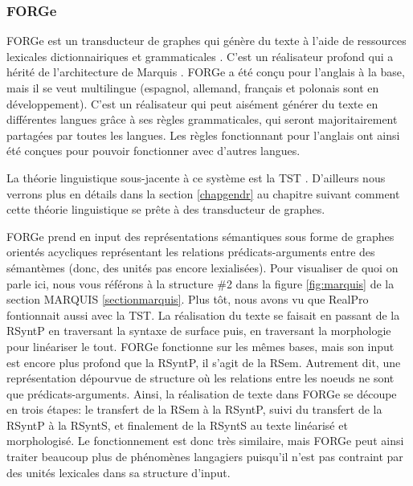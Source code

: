 \subsubsection{FORGe}
FORGe est un transducteur de graphes qui génère du texte à l'aide de ressources lexicales dictionnairiques et grammaticales \citep{MilledemoFORGePompeu2017,DBLP:conf/semeval/MilleCBW17}. C'est un réalisateur profond qui a hérité de l'architecture de Marquis \citep{WannerMARQUISGENERATIONUSERTAILORED2010}. FORGe a été conçu pour l'anglais à la base, mais il se veut multilingue (espagnol, allemand, français et polonais sont en développement). C'est un réalisateur qui peut aisément générer du texte en différentes langues grâce à ses règles grammaticales, qui seront majoritairement partagées par toutes les langues. Les règles fonctionnant pour l'anglais ont ainsi été conçues pour pouvoir fonctionner avec d'autres langues.

La théorie linguistique sous-jacente à ce système est la \ac{TST} \citep{melcuk1988, mel2012semantics, PolgueretheorieSensTexte1998, kahane05a, Milicevic2007ASG}. D'ailleurs nous verrons plus en détails dans la section \ref{chapgendr} au chapitre suivant comment cette théorie linguistique se prête à des transducteur de graphes.

FORGe prend en input des représentations sémantiques sous forme de graphes orientés acycliques représentant les relations prédicats-arguments entre des sémantèmes (donc, des unités pas encore lexialisées). Pour visualiser de quoi on parle ici, nous vous référons à la structure \#2 dans la figure \ref{fig:marquis} de la section MARQUIS \ref{sectionmarquis}. Plus tôt, nous avons vu que RealPro fontionnait aussi avec la \ac{TST}. La réalisation du texte se faisait en passant de la \ac{RSyntP} en traversant la syntaxe de surface puis, en traversant la morphologie pour linéariser le tout. FORGe fonctionne sur les mêmes bases, mais son input est encore plus profond que la \ac{RSyntP}, il s'agit de la \ac{RSem}. Autrement dit, une représentation dépourvue de structure où les relations entre les noeuds ne sont que prédicats-arguments. Ainsi, la réalisation de texte dans FORGe se découpe en trois étapes: le transfert de la \ac{RSem} à la \ac{RSyntP}, suivi du transfert de la \ac{RSyntP} à la \ac{RSyntS}, et finalement de la \ac{RSyntS} au texte linéarisé et morphologisé. Le fonctionnement est donc très similaire, mais FORGe peut ainsi traiter beaucoup plus de phénomènes langagiers puisqu'il n'est pas contraint par des unités lexicales dans sa structure d'input.


